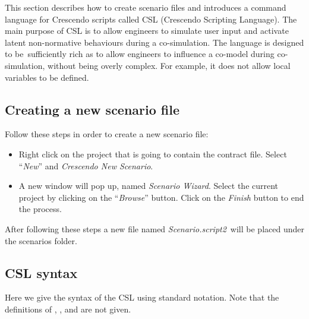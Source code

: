 \documentclass{crescendorepchap}
\begin{document}
This section describes how to create scenario files and introduces
a command language for Crescendo scripts called CSL (Crescendo
Scripting Language). The main purpose of CSL is to allow engineers to
simulate user input and activate latent non-normative behaviours during
a co-simulation. The language is designed to be~sufficiently rich as to
allow engineers to influence a co-model during co-simulation, without
being overly complex. For example, it does not allow local variables to
be defined.

\subsection{Creating a new scenario file}

Follow these steps in order to create a new scenario file:

\begin{itemize}
\item
  Right click on the project that is going to contain the contract file.
  Select ``\emph{New}'' and \emph{Crescendo New Scenario}.
\item
  A new window will pop up, named \emph{Scenario Wizard}. Select the
  current project by clicking on the ``\emph{Browse}'' button. Click on the
  \emph{Finish} button to end the process.
\end{itemize}

After following these steps a new file named \emph{Scenario.script2}~will
be placed under the scenarios folder. 



\subsection{CSL syntax}

Here we give the syntax of the CSL using standard notation.  Note that
the definitions of , , and 
are not given.
\end{document}
